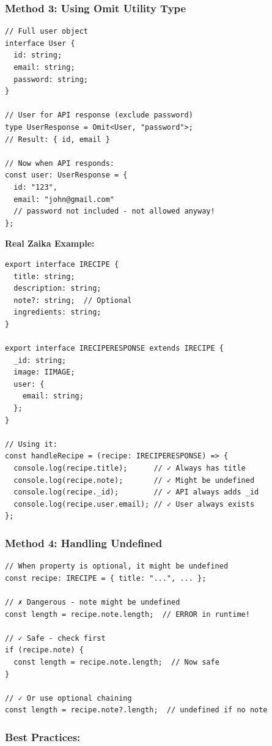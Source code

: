 \documentclass[12pt]{article}
\begin{document}
\subsubsection*{Method 3: Using Omit Utility Type}

\begin{lstlisting}
// Full user object
interface User {
  id: string;
  email: string;
  password: string;
}

// User for API response (exclude password)
type UserResponse = Omit<User, "password">;
// Result: { id, email }

// Now when API responds:
const user: UserResponse = {
  id: "123",
  email: "john@gmail.com"
  // password not included - not allowed anyway!
};
\end{lstlisting}

\textbf{Real Zaika Example:}

\begin{lstlisting}
export interface IRECIPE {
  title: string;
  description: string;
  note?: string;  // Optional
  ingredients: string;
}

export interface IRECIPERESPONSE extends IRECIPE {
  _id: string;
  image: IIMAGE;
  user: {
    email: string;
  };
}

// Using it:
const handleRecipe = (recipe: IRECIPERESPONSE) => {
  console.log(recipe.title);      // ✓ Always has title
  console.log(recipe.note);       // ✓ Might be undefined
  console.log(recipe._id);        // ✓ API always adds _id
  console.log(recipe.user.email); // ✓ User always exists
};
\end{lstlisting}

\subsubsection*{Method 4: Handling Undefined}

\begin{lstlisting}
// When property is optional, it might be undefined
const recipe: IRECIPE = { title: "...", ... };

// ✗ Dangerous - note might be undefined
const length = recipe.note.length;  // ERROR in runtime!

// ✓ Safe - check first
if (recipe.note) {
  const length = recipe.note.length;  // Now safe
}

// ✓ Or use optional chaining
const length = recipe.note?.length;  // undefined if no note
\end{lstlisting}

\subsubsection*{Best Practices:}
\end{document}
